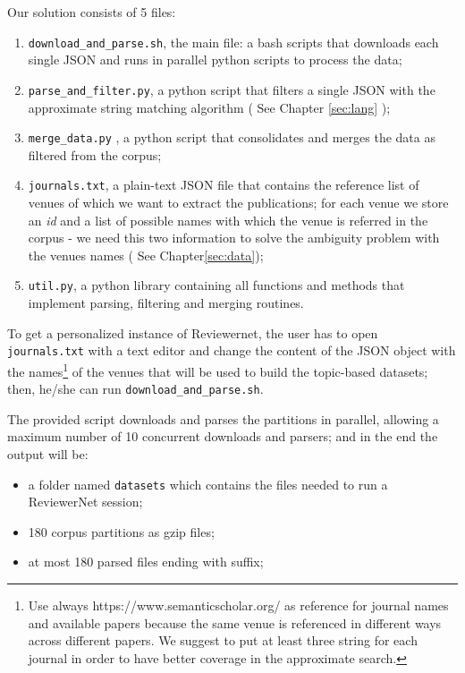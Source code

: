 Our solution consists of 5 files: 
\begin{enumerate}
\item \texttt{download\_and\_parse.sh}, the main file: a bash scripts that downloads each single JSON and runs in parallel python scripts to process the data;
\item \texttt{parse\_and\_filter.py}, a python script that filters a single JSON with the approximate string matching algorithm ( See Chapter \ref{sec:lang} );
\item \texttt{merge\_data.py} , a python script that consolidates and merges the data as filtered from the corpus;
\item \texttt{journals.txt}, a plain-text JSON file that contains the reference list of venues of which we want to extract the publications; for each venue we store an \emph{id} and a list of possible names with which the venue is referred in the corpus - we need this two information to solve the ambiguity problem with the venues names ( See Chapter\ref{sec:data});
\item \texttt{util.py}, a python library containing all functions and methods that implement parsing, filtering and merging routines.
\end{enumerate}

To get a personalized instance of Reviewernet, the user has to open \texttt{journals.txt} with a text editor and change the content of the JSON object with the names\footnote{Use always https://www.semanticscholar.org/ as reference for journal names and available papers because the same venue is referenced in different ways across different papers. We suggest to put at least three string for each journal in order to have better coverage in the approximate search.} of the venues that will be used to build the topic-based datasets; then, he/she can run \texttt{download\_and\_parse.sh}.

The provided script downloads and parses the partitions in parallel, allowing a maximum number of 10 concurrent downloads and parsers; and in the end the output will be:


    \begin{itemize}
        \item a folder named \texttt{datasets} which contains the files needed to run a ReviewerNet session;

        \item 180 corpus partitions as gzip files;

        \item at most 180 parsed files ending with  suffix;
    \end{itemize}

